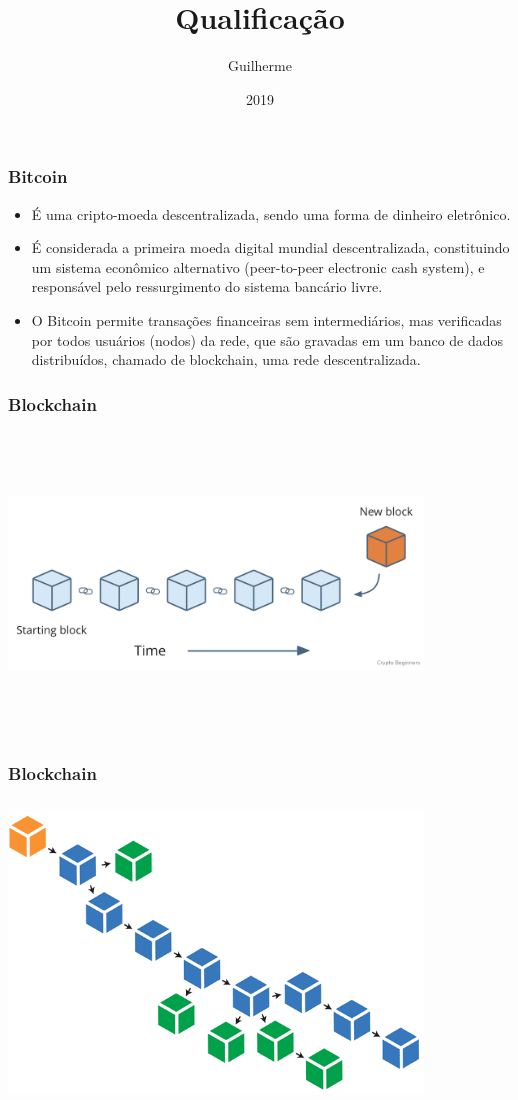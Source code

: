 \documentclass{beamer}
\title{Qualificação}
\author{Guilherme}
\institute{FGV}
\date{2019}
\begin{document}
 
\frame{\titlepage}
 
\begin{frame}
\frametitle{Bitcoin}
\begin{itemize}
    \item É uma cripto-moeda descentralizada, sendo uma forma de dinheiro eletrônico.
    \item É considerada a primeira moeda digital mundial descentralizada, constituindo um sistema econômico alternativo (peer-to-peer electronic cash system), e responsável pelo ressurgimento do sistema bancário livre.
    \item O Bitcoin permite transações financeiras sem intermediários, mas verificadas por todos usuários (nodos) da rede, que são gravadas em um banco de dados distribuídos, chamado de blockchain, uma rede descentralizada.
\end{itemize}
\end{frame}

\begin{frame}
\frametitle{Blockchain}
\includegraphics[width=11cm, height=8cm]{blockchain1}
\end{frame}

\begin{frame}
\frametitle{Blockchain}
\includegraphics[width=11cm, height=8cm]{blockchain2}
\end{frame}
\end{document}
